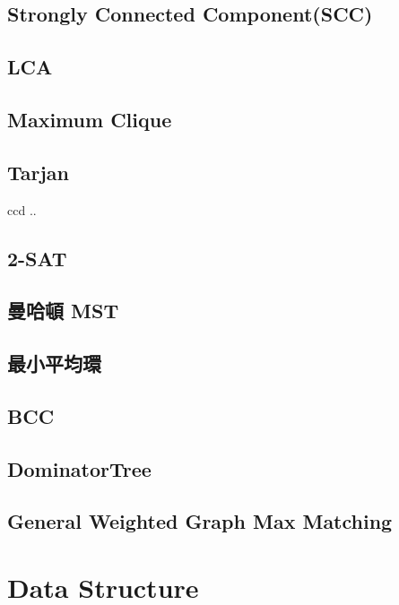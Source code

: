 \subsection{Strongly Connected Component(SCC)}

\subsection{LCA}

\subsection{Maximum Clique}

\subsection{Tarjan}ccd ..

\subsection{2-SAT}

\subsection{曼哈頓 MST}

\subsection{最小平均環}

%
\subsection{BCC}

\subsection{DominatorTree}

\subsection{General Weighted Graph Max Matching}


\section{Data Structure}

